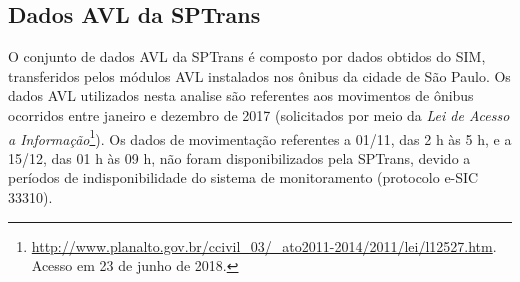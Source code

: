 \documentclass[
	12pt,				%
	oneside,			%
	a4paper,			%
	english,			%
	brazil				%
	]{abntex2ppgsi}
\begin{document}
{{\subsection{Dados AVL da SPTrans}

O conjunto de dados AVL da SPTrans é composto por dados obtidos do SIM, transferidos pelos módulos AVL instalados nos ônibus da cidade de São Paulo. Os dados AVL utilizados nesta analise são referentes aos movimentos de ônibus ocorridos entre janeiro e dezembro de 2017 (solicitados por meio da \textit{Lei de Acesso a Informação}\footnote{\url{http://www.planalto.gov.br/ccivil\_03/\_ato2011-2014/2011/lei/l12527.htm}. Acesso em 23 de junho de 2018.}). Os dados de movimentação referentes a 01/11, das 2 h às 5 h, e a 15/12, das 01 h às 09 h, não foram disponibilizados pela SPTrans,  devido a períodos de indisponibilidade do sistema de monitoramento (protocolo e-SIC 33310).

}}
\end{document}
